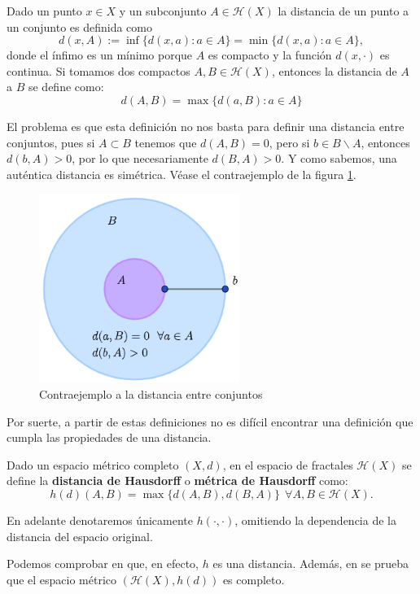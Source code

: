 Dado un punto $x\in X$ y un subconjunto $A\in\mathcal H(X)$ la distancia de un punto a un conjunto es definida como
$$
d(x,A) := \inf\{d(x,a):a\in A\}=\min\{d(x,a):a\in A\},
$$
donde el ínfimo es un mínimo porque $A$ es compacto y la función $d(x,\cdot)$ es continua. Si tomamos dos compactos $A,B\in\mathcal H(X)$, entonces la distancia de $A$ a $B$ se define como:
$$
d(A,B)=\max\{d(a,B):a\in A\}
$$

El problema es que esta definición no nos basta para definir una distancia entre conjuntos, pues si $A\subset B$ tenemos que $d(A,B)=0$, pero si $b\in B\backslash A$, entonces $d(b,A)>0$, por lo que necesariamente $d(B,A)>0$. Y como sabemos, una auténtica distancia es simétrica. Véase el contraejemplo de la figura \ref{fig:contraejemplo-distancia}. 
\begin{figure} [ht]
    \centering
    \includegraphics[width=6.5cm]{img/C4/no-distancia-hausdorff.png}
    \caption{Contraejemplo a la distancia entre conjuntos}
        \label{fig:contraejemplo-distancia}
\end{figure}

Por suerte, a partir de estas definiciones no es difícil encontrar una definición que cumpla las propiedades de una distancia.

\begin{definicion}
    Dado un espacio métrico completo $(X,d)$, en el espacio de fractales $\mathcal{H}(X)$ se define la \textbf{distancia de Hausdorff} o \textbf{métrica de Hausdorff} como:
    $$
    h(d)(A,B)=\max\{d(A,B),d(B,A)\} \ \ \forall A,B\in\mathcal H(X).
    $$
\end{definicion}

En adelante denotaremos únicamente $h(\cdot,\cdot)$, omitiendo la dependencia de la distancia del espacio original.

Podemos comprobar en \cite[Sección 2.6]{Barnsley} que, en efecto, $h$ es una distancia. Además, en \cite[Sección 2.7]{Barnsley} se prueba que el espacio métrico $(\mathcal{H}(X), h(d))$ es completo.

